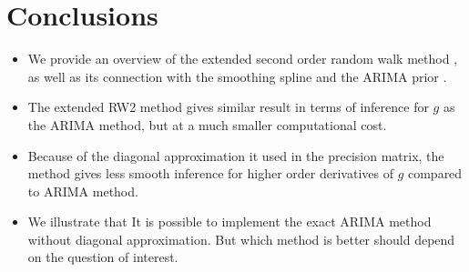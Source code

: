 \documentclass{beamer} %
\begin{document}
\section{Conclusions}
\begin{frame}
\begin{itemize}

\item We provide an overview of the extended second order random walk method \citep{rw2}, as well as its connection with the smoothing spline \citep{wahba} and the ARIMA prior \citep{ARIMA}.

\pause

\item The extended RW2 method gives similar result in terms of inference for $g$ as the ARIMA method, but at a much smaller computational cost. 

\pause

\item Because of the diagonal approximation it used in the precision matrix, the method gives less smooth inference for higher order derivatives of $g$ compared to ARIMA method.

\pause

\item We illustrate that It is possible to implement the exact ARIMA method without diagonal approximation. But which method is better should depend on the question of interest.

\end{itemize}
\end{frame}





\end{document}
